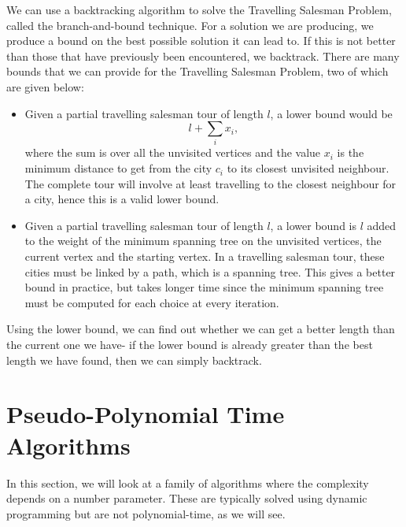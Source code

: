 \documentclass[a4paper, openany]{memoir}
\begin{document}
    We can use a backtracking algorithm to solve the Travelling Salesman Problem, called the branch-and-bound technique. For a solution we are producing, we produce a bound on the best possible solution it can lead to. If this is not better than those that have previously been encountered, we backtrack. There are many bounds that we can provide for the Travelling Salesman Problem, two of which are given below:
    \begin{itemize}
        \item Given a partial travelling salesman tour of length $l$, a lower bound would be
        \[l + \sum_i x_i,\]
        where the sum is over all the unvisited vertices and the value $x_i$ is the minimum distance to get from the city $c_i$ to its closest unvisited neighbour. The complete tour will involve at least travelling to the closest neighbour for a city, hence this is a valid lower bound.
        \item Given a partial travelling salesman tour of length $l$, a lower bound is $l$ added to the weight of the minimum spanning tree on the unvisited vertices, the current vertex and the starting vertex. In a travelling salesman tour, these cities must be linked by a path, which is a spanning tree. This gives a better bound in practice, but takes longer time since the minimum spanning tree must be computed for each choice at every iteration.
    \end{itemize}
    Using the lower bound, we can find out whether we can get a better length than the current one we have- if the lower bound is already greater than the best length we have found, then we can simply backtrack.


    \newpage

    \section{Pseudo-Polynomial Time Algorithms}
    In this section, we will look at a family of algorithms where the complexity depends on a number parameter. These are typically solved using dynamic programming but are not polynomial-time, as we will see.
\end{document}
